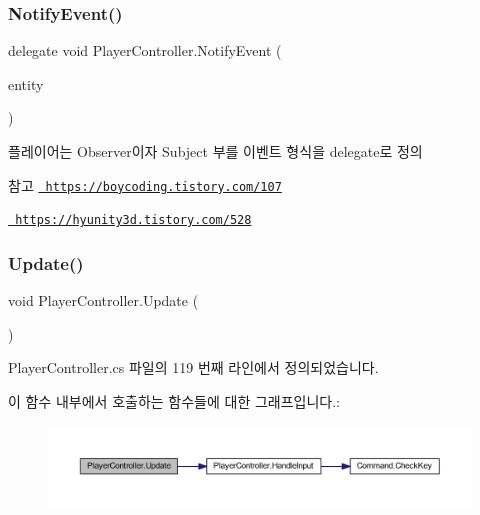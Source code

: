 \mbox{\label{class_player_controller_a934c7f80b80276620cd60eaaeea7520e}} 
\subsubsection{\texorpdfstring{NotifyEvent()}{NotifyEvent()}}
{\footnotesize\ttfamily delegate void Player\+Controller.\+Notify\+Event (\begin{DoxyParamCaption}\item[{Game\+Object}]{entity }\end{DoxyParamCaption})}



플레이어는 Observer이자 Subject 부를 이벤트 형식을 delegate로 정의 

\begin{DoxySeeAlso}{참고}
\href{https://boycoding.tistory.com/107}{\texttt{ https\+://boycoding.\+tistory.\+com/107}} 

\href{https://hyunity3d.tistory.com/528}{\texttt{ https\+://hyunity3d.\+tistory.\+com/528}} 
\end{DoxySeeAlso}
\mbox{\label{class_player_controller_ae8bc83dffb99867a04be016473ed2c43}} 
\subsubsection{\texorpdfstring{Update()}{Update()}}
{\footnotesize\ttfamily void Player\+Controller.\+Update (\begin{DoxyParamCaption}{ }\end{DoxyParamCaption})\hspace{0.3cm}{\ttfamily [private]}}



Player\+Controller.\+cs 파일의 119 번째 라인에서 정의되었습니다.


\begin{DoxyCode}{0}

\end{DoxyCode}
이 함수 내부에서 호출하는 함수들에 대한 그래프입니다.\+:\nopagebreak
\begin{figure}[H]
\begin{center}
\leavevmode
\includegraphics[width=350pt]{dc/dde/class_player_controller_ae8bc83dffb99867a04be016473ed2c43_cgraph}
\end{center}
\end{figure}


